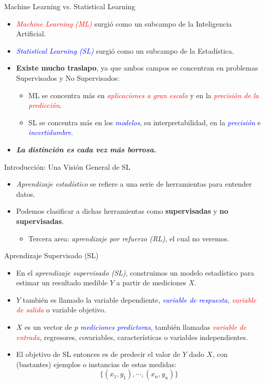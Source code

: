 \documentclass[usenames,dvipsnames]{beamer} %
\newcommand\bred[1]{\textcolor{red}{\textit{#1}}}
\newcommand\bblue[1]{\textcolor{blue}{\textit{#1}}}
\newcommand\defi[1]{\textcolor{NavyBlue}{\textit{#1}}}
\begin{document}
\begin{frame}{Machine Learning vs. Statistical Learning}
    \begin{itemize}
        \item \bred{Machine Learning (ML)} surgi\'o como un subcampo de la Inteligencia Artificial.
        \item \bblue{Statistical Learning (SL)} surgi\'o como un subcampo de la Estad\'istica.
        \item \textbf{Existe mucho traslapo}, ya que ambos campos se concentran en problemas Supervisados y No Supervisados:
        \begin{itemize}
            \item ML se concentra m\'as en \bred{aplicaciones a gran escala} y en la \bred{precisi\'on de la predicci\'on}.
            \item SL se concentra m\'as en los \bblue{modelos}, su interpretabilidad, en la \bblue{precisi\'on} e \bblue{incertidumbre}.
        \end{itemize}
        \item \textit{\textbf{La distinci\'on es cada vez m\'as borrosa.}}
    \end{itemize}
\end{frame}


\begin{frame}{Introducci\'on: Una Visi\'on General de SL}
    \begin{itemize}
        \item \defi{Aprendizaje estad\'istico} se refiere a una serie de herramientas para entender datos.
        \item Podemos clasificar a dichas herramientas como \textbf{supervisadas} y \textbf{no supervisadas}.
        \begin{itemize}
            \item Tercera area: \textit{aprendizaje por refuerzo (RL)}, el cual no veremos.
        \end{itemize} 
    \end{itemize}
\end{frame}

\begin{frame}{Aprendizaje Supervisado (SL)}
    \begin{itemize}
        \item En el \defi{aprendizaje supervisado (SL)}, construimos un modelo estad\'istico para estimar un resultado medible $Y$ a partir de mediciones $X$.
        \item $Y$ tambi\'en es llamado la variable dependiente, \bblue{variable de respuesta}, \bred{variable de salida} o variable objetivo.
        \item $X$ es un vector de $p$ \bblue{mediciones predictoras}, tambi\'en llamadas \bred{variable de entrada}, regresores, covariables, caracter\'isticas o variables independientes.
        \item El objetivo de SL entonces es de predecir el valor de $Y$ dado $X$, con (bastantes) ejemplos o instancias de estas medidas:
        \[ \{(x_{1}, y_{1}), \cdots, (x_{n}, y_{n}) \} \]
    \end{itemize}
    
\end{frame}
\end{document}

